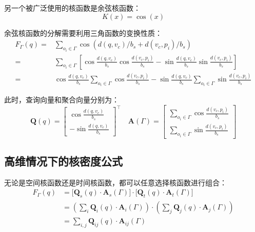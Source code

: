 另一个被广泛使用的核函数是余弦核函数：
\begin{equation*}
	K(x) = \cos(x)
\end{equation*}

余弦核函数的分解需要利用三角函数的变换性质：
\begin{equation*}
	\begin{aligned}
		F_\Gamma(q)
		=& \sum_{o_i \in \Gamma} \cos\left(d(q, v_c)/b_s + d(v_c, p_i)/b_s\right) \\
		=& \sum_{o_i \in \Gamma} \left[\cos \frac{d(q, v_c)}{b_s} \cos \frac{d(v_c, p_i)}{b_s} - \sin \frac{d(q, v_c)}{b_s} \sin \frac{d(v_c, p_i)}{b_s}\right] \\
		=& \cos \frac{d(q, v_c)}{b_s} \sum_{o_i \in \Gamma} \cos \frac{d(v_c, p_i)}{b_s} 
		-  \sin \frac{d(q, v_c)}{b_s} \sum_{o_i \in \Gamma} \sin \frac{d(v_c, p_i)}{b_s}
	\end{aligned}
\end{equation*}

此时，查询向量和聚合向量分别为：
\begin{equation*}
	\mathbf{Q}(q) = 
	\begin{bmatrix}
		\cos \frac{d(q, v_c)}{b_s} \\
		-\sin \frac{d(q, v_c)}{b_s}
	\end{bmatrix}^\top
	\quad
	\mathbf{A}(\Gamma) = 
	\begin{bmatrix}
		\sum_{o_i \in \Gamma} \cos \frac{d(v_c, p_i)}{b_s} \\
		\sum_{o_i \in \Gamma} \sin \frac{d(v_c, p_i)}{b_s}
	\end{bmatrix}
\end{equation*}

\subsection{高维情况下的核密度公式}

无论是空间核函数还是时间核函数，都可以任意选择核函数进行组合：
\begin{equation*}
\begin{aligned}
	F_\Gamma(q) &= \Big[\mathbf{Q}_s(q) \cdot \mathbf{A}_s(\Gamma)\Big] \cdot \Big[\mathbf{Q}_t(q) \cdot \mathbf{A}_t(\Gamma)\Big] \\
	&=\left(\sum_i \mathbf{Q}_i(q) \cdot \mathbf{A}_i(\Gamma)\right) \cdot \left(\sum_j \mathbf{Q}_j(q) \cdot \mathbf{A}_j(\Gamma)\right) \\
	&=\sum_{i,j} \mathbf{Q}_{ij}(q) \cdot \mathbf{A}_{ij}(\Gamma)
\end{aligned}
\end{equation*}

